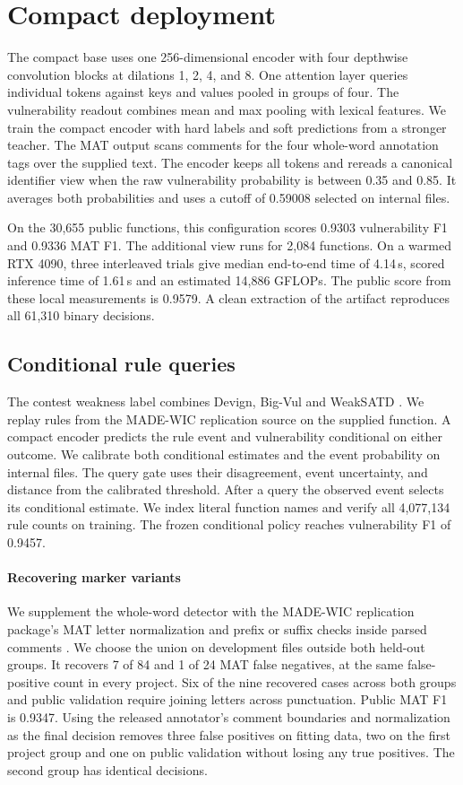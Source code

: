 \documentclass[10pt,conference]{IEEEtran}
\begin{document}
\section{Compact deployment}
The compact base uses one 256-dimensional encoder with four depthwise convolution blocks at dilations 1, 2, 4, and 8. One attention layer queries individual tokens against keys and values pooled in groups of four. The vulnerability readout combines mean and max pooling with lexical features. We train the compact encoder with hard labels and soft predictions from a stronger teacher. The MAT output scans comments for the four whole-word annotation tags over the supplied text. The encoder keeps all tokens and rereads a canonical identifier view when the raw vulnerability probability is between 0.35 and 0.85. It averages both probabilities and uses a cutoff of 0.59008 selected on internal files.

On the 30,655 public functions, this configuration scores 0.9303 vulnerability F1 and 0.9336 MAT F1. The additional view runs for 2,084 functions. On a warmed RTX 4090, three interleaved trials give median end-to-end time of 4.14\,s, scored inference time of 1.61\,s and an estimated 14,886 GFLOPs. The public score from these local measurements is 0.9579. A clean extraction of the artifact reproduces all 61,310 binary decisions.

\subsection{Conditional rule queries}
The contest weakness label combines Devign, Big-Vul and WeakSATD
\cite{rules,madewic,weaksatd}. We replay rules from the MADE-WIC
replication source on the supplied function. A compact encoder predicts
the rule event and vulnerability conditional on either outcome. We calibrate
both conditional estimates and the event probability on internal files.
The query gate uses their disagreement, event uncertainty, and distance
from the calibrated threshold. After a query the observed event selects
its conditional estimate. We index literal function names and verify
all 4,077,134 rule counts on training. The frozen conditional policy
reaches vulnerability F1 of 0.9457.

\paragraph{Recovering marker variants}
We supplement the whole-word detector with the MADE-WIC replication package's
MAT letter normalization and prefix or suffix checks inside parsed comments \cite{madewic}.
We choose the union on development files outside both held-out groups.
It recovers 7 of 84 and 1 of 24 MAT false negatives, at the same false-positive
count in every project. Six of the nine recovered cases across both groups
and public validation require joining letters across punctuation. Public
MAT F1 is 0.9347. Using the released annotator's comment boundaries and
normalization as the final decision removes three false positives on fitting
data, two on the first project group and one on public validation without
losing any true positives. The second group has identical decisions.
\end{document}
